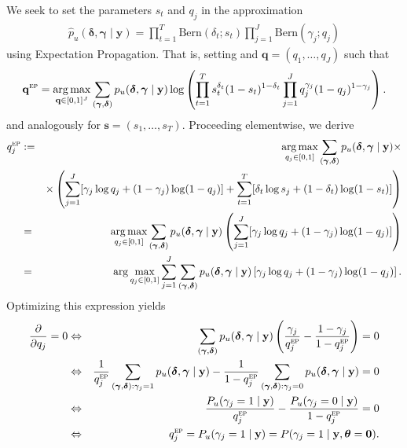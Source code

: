 \documentclass[12pt]{article}
\newcommand{\mb}[1]{\mathbf{#1}}
\DeclareMathOperator*{\argmax}{arg\,max}
\newcommand{\by}{{\mb{y}}}
\newcommand{\bgamma}{{\bm{\gamma}}}
\newcommand{\bdelta}{{\bm{\delta}}}
\newcommand{\btheta}{{\bm{\theta}}}
\begin{document}
We seek to set the parameters $s_t$ and $q_j$ in the approximation
\begin{align}
\hat{p}_{u}(\bdelta, \bgamma \mid \by) = \prod_{t=1}^{T} \text{Bern}(\delta_{t}; s_{t}) \prod_{j=1}^{J} \text{Bern}(\gamma_{j}; q_{j})
\nonumber
\end{align}
using Expectation Propagation. That is, setting and $\mb{q} = (q_1, \dots, q_J)$ such that
\begin{align*}
\mb{q}^{\textsc{ep}} = \argmax_{\mb{q} \in [0,1]^{J}} \sum_{(\bgamma, \bdelta)} p_{u}(\bdelta, \bgamma \mid \by) \log \left(\prod_{t=1}^{T} s_{t}^{\delta_{t}} (1-s_{t})^{1-\delta_{t}} \prod_{j=1}^{J} q_{j}^{\gamma_{j}} (1-q_{j})^{1-\gamma_{j}}  \right).
\end{align*}
and analogously for $\mb{s} = (s_1, \dots, s_T)$. Proceeding elementwise, we derive
\begin{eqnarray}
q_{j}^{\textsc{ep}} &:=& \argmax_{q_j \in [0,1]} \sum_{(\bgamma, \bdelta)} p_{u}(\bdelta, \bgamma \mid \by) \times \nonumber \\
&& \times \left( \sum_{j=1}^{J} [\gamma_j \log q_{j} + (1 - \gamma_{j}) \log(1-q_{j})] + \sum_{t=1}^{T} [\delta_t \log s_{j} + (1 - \delta_{t}) \log(1-s_{t})] \right) \nonumber \\
&=& \argmax_{q_j \in [0,1]} \sum_{(\bgamma, \bdelta)} p_{u}(\bdelta, \bgamma \mid \by) \left( \sum_{j=1}^{J} [\gamma_j \log q_{j} + (1 - \gamma_{j}) \log(1-q_{j})] \right) \nonumber \\
&=& \arg \max_{q_j \in [0,1]} \sum_{j=1}^{J} \sum_{(\bgamma, \bdelta)} p_{u}(\bdelta, \bgamma \mid \by) \left[ \gamma_j \log q_j + (1 - \gamma_j) \log (1 - q_j) \right]. \nonumber
\end{eqnarray}
Optimizing this expression yields
\begin{eqnarray}
\frac{\partial}{\partial q_j} = 0 &\Leftrightarrow& \sum_{(\bgamma, \bdelta)} p_{u}(\bdelta, \bgamma \mid \by) \left( \frac{\gamma_j}{q_{j}^{\textsc{ep}}} - \frac{1 - \gamma_j}{1 - q_{j}^{\textsc{ep}}} \right) = 0 \nonumber \\
&\Leftrightarrow& \frac{1}{q_{j}^{\textsc{ep}}} \sum_{(\bgamma, \bdelta): \gamma_j = 1} p_{u}(\bdelta, \bgamma \mid \by) - \frac{1}{1 - q_{j}^{\textsc{ep}}} \sum_{(\bgamma, \bdelta): \gamma_j = 0} p_{u}(\bdelta, \bgamma \mid \by) = 0 \nonumber \\
&\Leftrightarrow& \frac{P_{u}(\gamma_j = 1 \mid \by)}{q_{j}^{\textsc{ep}}} - \frac{P_{u}(\gamma_j = 0 \mid \by)}{1 - q_{j}^{\textsc{ep}}} = 0 \nonumber \\
&\Leftrightarrow& q_{j}^{\textsc{ep}} = P_{u}(\gamma_j = 1 \mid \by) = P(\gamma_j = 1 \mid \by, \btheta = \mb{0}). \label{eq:prop3_eq2}
\end{eqnarray}
\end{document}
